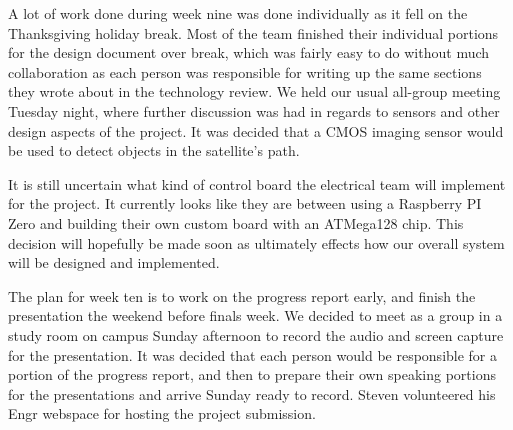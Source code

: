 \documentclass[10pt,letterpaper,onecolumn,draftclsnofoot,journal]{IEEEtran}
\begin{document}
A lot of work done during week nine was done individually as it fell on the Thanksgiving holiday break. Most of the team finished their individual portions for the design document over break, which was fairly easy to do without much collaboration as each person was responsible for writing up the same sections they wrote about in the technology review. We held our usual all-group meeting Tuesday night, where further discussion was had in regards to sensors and other design aspects of the project. It was decided that a CMOS imaging sensor would be used to detect objects in the satellite's path.\vspace{.3cm}
\par
It is still uncertain what kind of control board the electrical team will implement for the project. It currently looks like they are between using a Raspberry PI Zero and building their own custom board with an ATMega128 chip. This decision will hopefully be made soon as ultimately effects how our overall system will be designed and implemented.\vspace{.3cm}
\par
The plan for week ten is to work on the progress report early, and finish the presentation the weekend before finals week. We decided to meet as a group in a study room on campus Sunday afternoon to record the audio and screen capture for the presentation. It was decided that each person would be responsible for a portion of the progress report, and then to prepare their own speaking portions for the presentations and arrive Sunday ready to record. Steven volunteered his Engr webspace for hosting the project submission.\vspace{.3cm}
\end{document}
